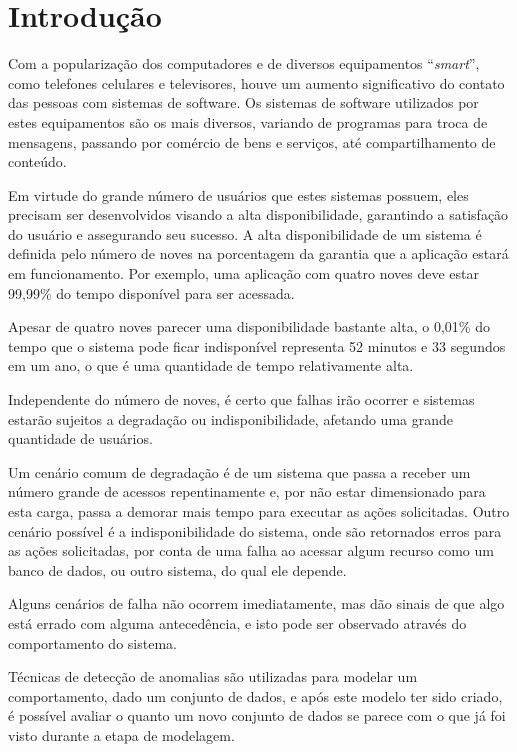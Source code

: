 
\chapter{Introdução}
\label{cap:introducao}

Com a popularização dos computadores e de diversos equipamentos ``\textit{smart}'',
como telefones celulares e televisores, houve um aumento significativo do contato
das pessoas com sistemas de software. Os sistemas de software utilizados por estes
equipamentos são os mais diversos, variando de programas para troca de mensagens,
passando por comércio de bens e serviços, até compartilhamento de conteúdo.

Em virtude do grande número de usuários que estes sistemas possuem, eles precisam
ser desenvolvidos visando a alta disponibilidade, garantindo a satisfação do usuário
e assegurando seu sucesso. A alta disponibilidade de um sistema é definida pelo
número de noves na porcentagem da garantia que a aplicação estará em funcionamento.
Por exemplo, uma aplicação com quatro noves deve estar 99,99\% do tempo disponível
para ser acessada.

Apesar de quatro noves parecer uma disponibilidade bastante alta, o 0,01\% do tempo
que o sistema pode ficar indisponível representa 52 minutos e 33 segundos em um ano,
o que é uma quantidade de tempo relativamente alta.

Independente do número de noves, é certo que falhas irão ocorrer e sistemas estarão
sujeitos a degradação ou indisponibilidade, afetando uma grande quantidade de usuários.

Um cenário comum de degradação é de um sistema que passa a receber um número grande
de acessos repentinamente e, por não estar dimensionado para esta carga, passa a
demorar mais tempo para executar as ações solicitadas. Outro cenário possível é a
indisponibilidade do sistema, onde são retornados erros para as ações solicitadas,
por conta de uma falha ao acessar algum recurso como um banco de dados, ou outro
sistema, do qual ele depende.

Alguns cenários de falha não ocorrem imediatamente, mas dão sinais de que algo está
errado com alguma antecedência, e isto pode ser observado através do comportamento
do sistema.

Técnicas de detecção de anomalias são utilizadas para modelar um comportamento,
dado um conjunto de dados, e após este modelo ter sido criado, é possível avaliar
o quanto um novo conjunto de dados se parece com o que já foi visto durante a etapa
de modelagem.

